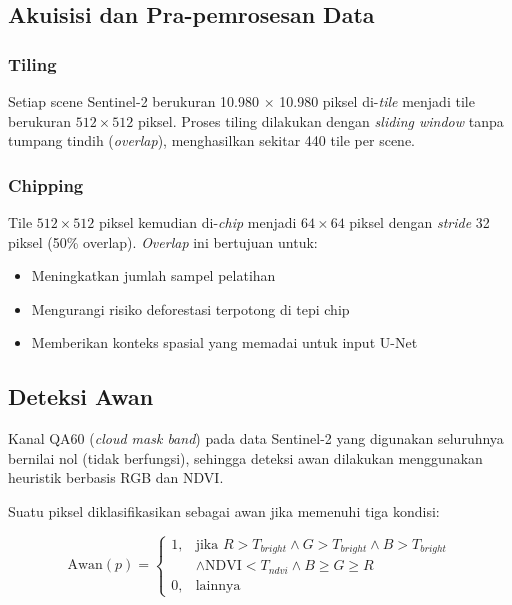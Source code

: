 \documentclass[12pt,a4paper]{article}
\begin{document}
\subsection{Akuisisi dan Pra-pemrosesan Data}

\subsubsection{Tiling}

Setiap scene Sentinel-2 berukuran 10.980 $\times$ 10.980 piksel di-\textit{tile}
menjadi tile berukuran $512 \times 512$ piksel. Proses tiling dilakukan dengan 
\textit{sliding window} tanpa tumpang tindih (\textit{overlap}), menghasilkan 
sekitar 440 tile per scene.

\subsubsection{Chipping}

Tile $512 \times 512$ piksel kemudian di-\textit{chip} menjadi $64 \times 64$ 
piksel dengan \textit{stride} 32 piksel (50\% overlap). \textit{Overlap} ini 
bertujuan untuk:

\begin{itemize}[nosep]
    \item Meningkatkan jumlah sampel pelatihan
    \item Mengurangi risiko deforestasi terpotong di tepi chip
    \item Memberikan konteks spasial yang memadai untuk input U-Net
\end{itemize}

\subsection{Deteksi Awan}

Kanal QA60 (\textit{cloud mask band}) pada data Sentinel-2 yang digunakan 
seluruhnya bernilai nol (tidak berfungsi), sehingga deteksi awan dilakukan 
menggunakan heuristik berbasis RGB dan NDVI.

Suatu piksel diklasifikasikan sebagai awan jika memenuhi tiga kondisi:

\begin{equation}
    \label{eq:cloud}
    \text{Awan}(p) =
    \begin{cases}
        1, & \text{jika } R > T_{bright} \land G > T_{bright} \land B > T_{bright} \\
           & \land \text{NDVI} < T_{ndvi} \land B \geq G \geq R \\
        0, & \text{lainnya}
    \end{cases}
\end{equation}
\end{document}
